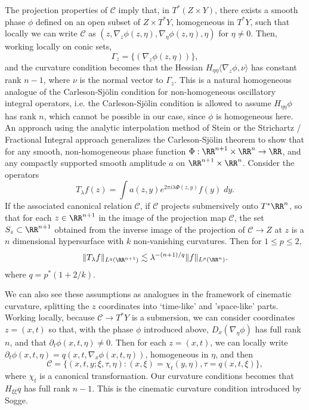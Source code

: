 \begin{remark}
    The projection properties of $\mathcal{C}$ imply that, in $T^* (Z \times Y)$, there exists a smooth phase $\phi$ defined on an open subset of $Z \times T^* Y$, homogeneous in $T^* Y$, such that locally we can write $\mathcal{C}$ as $(z, \nabla_z \phi(z,\eta), \nabla_\eta \phi(z,\eta), \eta)$ for $\eta \neq 0$. Then, working locally on conic sets,
    \[ \Gamma_z = \{ (\nabla_z \phi(z,\eta)) \}, \]
    and the curvature condition becomes that the Hessian $H_{\eta \eta} \langle \nabla_z \phi, \nu \rangle$ has constant rank $n-1$, where $\nu$ is the normal vector to $\Gamma_z$. This is a natural homogeneous analogue of the Carleson-Sj\"{o}lin condition for non-homogeneous oscillatory integral operators, i.e. the Carleson-Sj\"{o}lin condition is allowed to assume $H_{\eta \eta} \phi$ has rank $n$, which cannot be possible in our case, since $\phi$ is homogeneous here. An approach using the analytic interpolation method of Stein or the Strichartz / Fractional Integral approach generalizes the Carleson-Sj\"{o}lin theorem to show that for any smooth, non-homogeneous phase function $\Phi: \RR^{n+1} \times \RR^n \to \RR$, and any compactly supported smooth amplitude $a$ on $\RR^{n+1} \times \RR^n$. Consider the operators
    \[ T_\lambda f(z) = \int a(z,y) e^{2 \pi i \lambda \Phi(z,y)} f(y)\; dy. \]
    If the associated canonical relation $\mathcal{C}$, if $\mathcal{C}$ projects submersively onto $T^* \RR^n$, so that for each $z \in \RR^{n+1}$ in the image of the projection map $\mathcal{C}$, the set $S_z \subset \RR^{n+1}$ obtained from the inverse image of the projection of $\mathcal{C} \to Z$ at $z$ is a $n$ dimensional hypersurface with $k$ non-vanishing curvatures. Then for $1 \leq p \leq 2$,
    \[ \| T_\lambda f \|_{L^q(\RR^{n+1})} \lesssim \lambda^{-(n+1)/q} \| f \|_{L^p(\RR^n)}. \]
    where $q = p^*(1 + 2/k)$.
\end{remark}

\begin{remark}
    We can also see these assumptions as analogues in the framework of cinematic curvature, splitting the $z$ coordinates into `time-like' and 'space-like' parts. Working locally, because $\mathcal{C} \to T^* Y$ is a submersion, we can consider coordinates $z = (x,t)$ so that, with the phase $\phi$ introduced above, $D_x (\nabla_\eta \phi)$ has full rank $n$, and that $\partial_t \phi(x,t,\eta) \neq 0$. Then for each $z = (x,t)$, we can locally write $\partial_t \phi(x,t,\eta) = q(x,t,\nabla_x \phi(x,t,\eta))$, homogeneous in $\eta$, and then
    \[ \mathcal{C} = \{ (x,t,y;\xi,\tau,\eta) : (x,\xi) = \chi_t(y,\eta), \tau = q(x,t,\xi) \}, \]
    where $\chi_t$ is a canonical transformation. Our curvature conditions becomes that $H_{\xi \xi} q$ has full rank $n-1$. This is the cinematic curvature condition introduced by Sogge. %
\end{remark}

